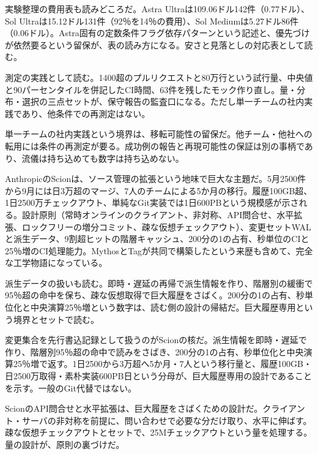 \documentclass[lualatex,a4paper,10pt]{jlreq}
\begin{document}
実験整理の費用表も読みどころだ。Astra Ultraは109.06ドル142件（0.77ドル）、Sol Ultraは15.12ドル131件（92％を14％の費用）、Sol Mediumは5.27ドル86件（0.06ドル）。Astra固有の定数条件フラグ依存パターンという記述と、優先づけが依然要るという留保が、表の読み方になる。安さと見落としの対応表として読む。
\cite{B31}


測定の実践として読む。1400超のプルリクエストと80万行という試行量、中央値と90パーセンタイルを併記したCI時間、63件を残したモック作り直し。量・分布・選択の三点セットが、保守報告の監査口になる。ただし単一チームの社内実践であり、他条件での再測定はない。
\cite{B31}


単一チームの社内実践という境界は、移転可能性の留保だ。他チーム・他社への転用には条件の再測定が要る。成功例の報告と再現可能性の保証は別の事柄であり、流儀は持ち込めても数字は持ち込めない。
\cite{B31}


AnthropicのScionは、ソース管理の拡張という地味で巨大な主題だ。5月2500件から9月には日3万超のマージ、7人のチームによる5か月の移行。履歴100GB超、1日2500万チェックアウト、単純なGit実装では1日600PBという規模感が示される。設計原則（常時オンラインのクライアント、非対称、API問合せ、水平拡張、ロックフリーの増分コミット、疎な仮想チェックアウト）、変更セットWALと派生データ、9割超ヒットの階層キャッシュ、200分の1の占有、秒単位のCIと25％増のCI処理能力。MythosとTagが共同で構築したという来歴も含めて、完全な工学物語になっている。
\cite{B32,B75}


派生データの扱いも読む。即時・遅延の再帰で派生情報を作り、階層別の緩衝で95％超の命中を保ち、疎な仮想取得で巨大履歴をさばく。200分の1の占有、秒単位化と中央演算25％増という数字は、読む側の設計の帰結だ。巨大履歴専用という境界とセットで読む。
\cite{B32,B75}


変更集合を先行書込記録として扱うのがScionの核だ。派生情報を即時・遅延で作り、階層別95％超の命中で読みをさばき、200分の1の占有、秒単位化と中央演算25％増で返す。1日2500から3万超へ5か月・7人という移行量と、履歴100GB・日2500万取得・素朴実装600PB日という分母が、巨大履歴専用の設計であることを示す。一般のGit代替ではない。
\cite{B32,B75}


ScionのAPI問合せと水平拡張は、巨大履歴をさばくための設計だ。クライアント・サーバの非対称を前提に、問い合わせで必要な分だけ取り、水平に伸ばす。疎な仮想チェックアウトとセットで、25Mチェックアウトという量を処理する。量の設計が、原則の裏づけだ。
\cite{B32,B75}
\end{document}
